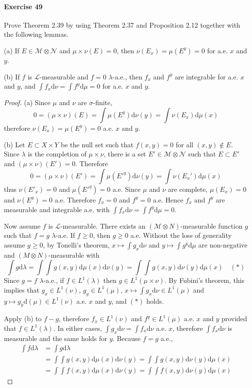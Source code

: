 \paragraph{Exercise 49}
Prove Theorem 2.39 by using Theorem 2.37 and Proposition 2.12 together with the following lemmas.
\par (a) If $E\in\mathcal{M}\otimes\mathcal{N}$ and $\mu\times\nu(E)=0$, then $\nu(E_x)=\mu(E^y)=0$ for a.e. $x$ and $y$.
\par (b) If $f$ is $\mathcal{L}$-measurable and $f=0$ $\lambda$-a.e., then $f_x$ and $f^y$ are integrable for a.e. $x$ and $y$, and $\int f_x\mathrm{d}\nu=\int f^y\mathrm{d}\mu=0$ for a.e. $x$ and $y$.
\begin{proof}
    \par (a) Since $\mu$ and $\nu$ are $\sigma$-finite,
    $$
    0=(\mu\times\nu)(E)=\int\mu(E^y)\mathrm{d}\nu(y)=\int\nu(E_x)\mathrm{d}\mu(x)
    $$
    therefore $\nu(E_x)=\mu(E^y)=0$ a.e. $x$ and $y$.
    \par (b) Let $E\subset X\times Y$ be the null set such that $f(x,y)=0$ for all $(x,y)\not\in E$. Since $\lambda$ is the completion of $\mu\times\nu$, there is a set $E'\in\mathcal{M}\otimes\mathcal{N}$ such that $E\subset E'$ and $(\mu\times\nu)(E')=0$. Therefore
    $$
    0=(\mu\times\nu)(E')=\int\mu(E'^y)\mathrm{d}\nu(y)=\int\nu(E_x')\mathrm{d}\mu(x)
    $$
    thus $\nu(E'_x)=0$ and $\mu(E'^y)=0$ a.e. Since $\mu$ and $\nu$ are complete, $\mu(E_x)=0$ and $\nu(E^y)=0$ a.e. Therefore $f_x=0$ and $f^y=0$ a.e. Hence $f_x$ and $f^y$ are measurable and integrable a.e. with $\int f_x\mathrm{d}\nu=\int f^y\mathrm{d}\mu=0$.
    \par Now assume $f$ is $\mathcal{L}$-measurable. There exists an $(\mathcal{M}\otimes N)$-measurable function $g$ such that $f=g$ $\lambda$-a.e. If $f\ge 0$, then $g\ge 0$ a.e. Without the loss of generality assume $g\ge 0$, by Tonelli's theorem, $x\mapsto\int g_x\mathrm{d}\nu$ and $y\mapsto\int g^y\mathrm{d}\mu$ are non-negative and $(M\otimes N)$-measurable with
    $$
    \int g\mathrm{d}\lambda=\int\int g(x,y)\mathrm{d}\mu(x)\mathrm{d}\nu(y)=\int\int g(x,y)\mathrm{d}\nu(y)\mathrm{d}\mu(x)\quad (*)
    $$
    Since $g=f$ $\lambda$-a.e., if $f\in L^1(\lambda)$ then $g\in L^1(\mu\times\nu)$. By Fubini's theorem, this implies that $g_x\in L^1(\nu)$, $g_y\in L^1(\mu)$, $x\mapsto\int g_x\mathrm{d}\nu\in L^1(\mu)$ and $y\mapsto g_y\mathrm{d}(\mu)\in L^1(\nu)$ a.e. $x$ and $y$,  and $(*)$ holds.
    \par Apply (b) to $f-g$, therefore $f_x\in L^1(\nu)$ and $f^y\in L^1(\mu)$ a.e. $x$ and $y$ provided that $f\in L^1(\lambda)$. In either cases, $\int g_x\mathrm{d}\nu=\int f_x\mathrm{d}\nu$ a.e. $x$, therefore $\int f_x\mathrm{d}\nu$ is measurable and the same holds for $y$. Because $f=g$ a.e.,
    \begin{align*}
        \int f\mathrm{d}\lambda&=\int g\mathrm{d}\lambda\\
        &=\int\int g(x,y)\mathrm{d}\mu(x)\mathrm{d}\nu(y)=\int\int g(x,y)\mathrm{d}\nu(y)\mathrm{d}\mu(x)\\
        &=\int\int f(x,y)\mathrm{d}\mu(x)\mathrm{d}\nu(y)=\int\int f(x,y)\mathrm{d}\nu(y)\mathrm{d}\mu(x)
    \end{align*}
\end{proof}
